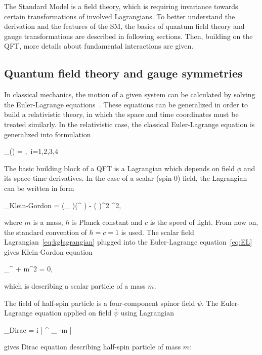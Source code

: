 The Standard Model is a field theory, which is requiring invariance towards certain transformations of involved Lagrangians. To better understand the derivation and the features of the SM, the basics of quantum field theory and gauge transformations are described in following sections. Then, building on the QFT, more details about fundamental interactions are given.

\subsection{Quantum field theory and gauge symmetries}

In classical mechanics, the motion of a given system can be calculated by solving the Euler-Lagrange equations~\cite{9783527411887}. These equations can be generalized in order to build a relativistic theory, in which the space and time coordinates must be treated similarly. In the relativistic case, the classical Euler-Lagrange equation is generalized into formulation

{
 \partial_{\mu}\left (\right) = ,~i=1,2,3,4
}


The basic building block of a QFT is a Lagrangian which depends on field $\phi$ and its space-time derivatives. In the case of a scalar (spin-0) field, the Lagrangian can be written in form 

{
 _{Klein-Gordon} = (\partial_{\mu} \phi)(\partial^{\mu} \phi) -  \left( \right)^{2} \phi^{2},
}

where $m$ is a mass, $\hbar$ is Planck constant and $c$ is the speed of light. From now on, the standard convention of $\hbar = c = 1$ is used. The scalar field Lagrangian~\ref{eq:kglagrangian} plugged into the Euler-Lagrange equation~\ref{eq:EL} gives Klein-Gordon equation

{
 \partial_{\mu}\partial^{\mu} \phi + m^{2} \phi = 0,
}

which is describing a scalar particle of a mass $m$. 

The field of half-spin particle is a four-component spinor field $\psi$. The Euler-Lagrange equation applied on field $\bar{\psi}$ using Lagrangian


{
 _{Dirac} = i \bar{\psi} \gamma^{\mu} \partial_{\mu} \psi -m \bar{\psi} \psi
}

gives Dirac equation describing half-spin particle of mass $m$:

